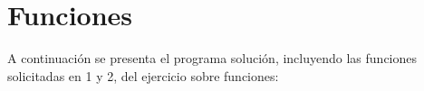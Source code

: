 \section{Funciones}

  A continuación se presenta el programa solución,
  incluyendo las funciones solicitadas en 1 y 2,
  del ejercicio sobre funciones:
  
  